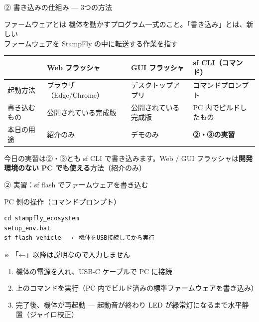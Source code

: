 \begin{frame}{② 書き込みの仕組み --- 3つの方法}
  \begin{block}{ファームウェアとは}
    \footnotesize 機体を動かすプログラム一式のこと。「書き込み」とは、新しい\\
    ファームウェアを StampFly の中に転送する作業を指す
  \end{block}

  \vspace{0.3em}

  \begin{table}
    \centering\footnotesize
    \begin{tabular}{l>{\raggedright\arraybackslash}p{28mm}>{\raggedright\arraybackslash}p{28mm}>{\raggedright\arraybackslash}p{34mm}}
      \hline
       & \textbf{Web フラッシャ} & \textbf{GUI フラッシャ} & \textbf{sf CLI（コマンド）} \\
      \hline
      起動方法     & ブラウザ（Edge/Chrome） & デスクトップアプリ & コマンドプロンプト \\
      書き込むもの & 公開されている完成版 & 公開されている完成版 & PC 内でビルドしたもの \\
      本日の用途   & 紹介のみ & デモのみ & \textbf{②・③の実習} \\
      \hline
    \end{tabular}
  \end{table}

  \vspace{0.3em}

  {\footnotesize 今日の実習は②・③とも sf CLI で書き込みます。Web / GUI フラッシャは\textbf{開発環境のない PC でも使える}方法（紹介のみ）}
\end{frame}

\begin{frame}[fragile]{② 実習：sf flash でファームウェアを書き込む}
  \begin{block}{PC 側の操作（コマンドプロンプト）}
    \begin{lstlisting}[style=sfbash, numbers=none]
cd stampfly_ecosystem
setup_env.bat
sf flash vehicle   ← 機体をUSB接続してから実行
    \end{lstlisting}
  \end{block}

  {\footnotesize ※ 「←」以降は説明なので入力しません}

  \vspace{0.2em}

  \begin{enumerate}\small
    \item 機体の電源を入れ、USB-C ケーブルで PC に接続
    \item 上のコマンドを実行（PC 内でビルド済みの標準ファームウェアを書き込み）
    \item 完了後、機体が再起動 --- 起動音が終わり LED が緑常灯になるまで水平静置（ジャイロ校正）
  \end{enumerate}
\end{frame}

